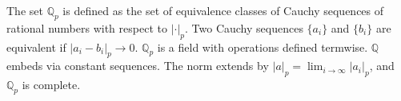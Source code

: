 The set $\mathbb{Q}_p$ is defined as the set of equivalence classes of Cauchy sequences of rational numbers with respect to $|\cdot|_p$. Two Cauchy sequences $\{a_i\}$ and $\{b_i\}$ are equivalent if $|a_i - b_i|_p \to 0$. $\mathbb{Q}_p$ is a field with operations defined termwise. $\mathbb{Q}$ embeds via constant sequences. The norm extends by $|a|_p = \lim_{i\to\infty}|a_i|_p$, and $\mathbb{Q}_p$ is complete.
